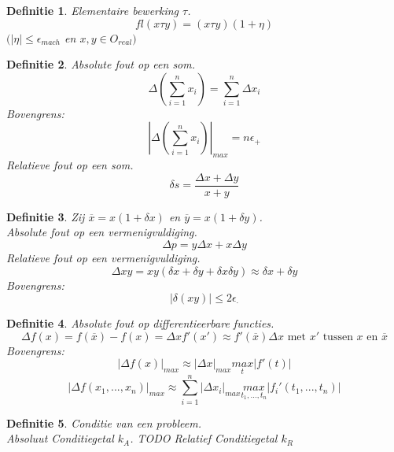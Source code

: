 \documentclass[12pt,a4paper]{article}
\newtheorem{defi}{Definitie}
\begin{document}
\begin{defi}
Elementaire bewerking $\tau$.
\[
fl(x \tau y) = (x \tau y)(1 + \eta)
\]
$(|\eta| \le \epsilon_{mach}$ en $x,y \in O_{real})$
\end{defi}
\begin{defi}
Absolute fout op een som.
\[
\Delta\left(\sum_{i=1}^nx_i\right) = \sum_{i=1}^n\Delta x_i
\]
Bovengrens:
\[
\left|\Delta\left(\sum_{i=1}^nx_i\right)\right|_{max} = n\epsilon_{+}
\]
Relatieve fout op een som.
\[
\delta s = \frac{\Delta x + \Delta y}{x+y}
\]
\end{defi}
\begin{defi}
Zij $\overline{x} = x(1+\delta x)$ en $\overline{y} = x(1+\delta y)$.\\
Absolute fout op een vermenigvuldiging.
\[
\Delta p = y\Delta x + x\Delta y
\]
Relatieve fout op een vermenigvuldiging. 
\[
\Delta xy = xy(\delta x + \delta y + \delta x \delta y) \approx \delta x + \delta y
\]
Bovengrens:
\[
|\delta(xy)| \le 2\epsilon_{\cdot}
\]
\end{defi}
\begin{defi}
Absolute fout op differentieerbare functies.
\[
\Delta f(x) = f(\overline{x}) - f(x) = \Delta x f'(x') \approx f'(\overline{x})\Delta x\text{ met } x' \text{ tussen } x \text{ en }\overline{x}
\]
Bovengrens:
\[
|\Delta f(x)|_{max} \approx |\Delta x|_{max} \underset{t}{max}|f'(t)|
\]
\[
|\Delta f(x_1,...,x_n)|_{max} \approx \sum_{i=1}^n|\Delta x_i|_{max} \underset{t_1,...,t_n}{max}|f_i'(t_1,...,t_n)|
\]
\end{defi}
\begin{defi}
Conditie van een probleem.\\
Absoluut Conditiegetal $k_A$.
TODO
Relatief Conditiegetal $k_R$
\end{defi}
\end{document}
